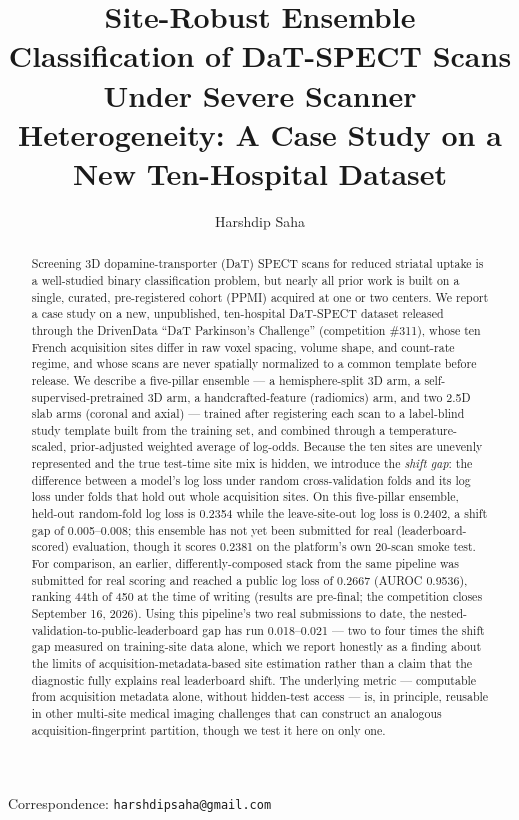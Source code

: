 \documentclass[11pt]{article}
\title{\textbf{Site-Robust Ensemble Classification of DaT-SPECT Scans Under Severe Scanner Heterogeneity: A Case Study on a New Ten-Hospital Dataset}}
\author[1]{Harshdip Saha}
\affil[1]{Independent Researcher}
\date{}
\begin{document}
\maketitle

\begin{center}
\small
Correspondence: \texttt{harshdipsaha@gmail.com}
\end{center}

\begin{abstract}
\noindent
Screening 3D dopamine-transporter (DaT) SPECT scans for reduced striatal uptake is a well-studied binary classification problem, but nearly all prior work is built on a single, curated, pre-registered cohort (PPMI) acquired at one or two centers. We report a case study on a new, unpublished, ten-hospital DaT-SPECT dataset released through the DrivenData ``DaT Parkinson's Challenge'' (competition \#311), whose ten French acquisition sites differ in raw voxel spacing, volume shape, and count-rate regime, and whose scans are never spatially normalized to a common template before release. We describe a five-pillar ensemble --- a hemisphere-split 3D arm, a self-supervised-pretrained 3D arm, a handcrafted-feature (radiomics) arm, and two 2.5D slab arms (coronal and axial) --- trained after registering each scan to a label-blind study template built from the training set, and combined through a temperature-scaled, prior-adjusted weighted average of log-odds. Because the ten sites are unevenly represented and the true test-time site mix is hidden, we introduce the \emph{shift gap}: the difference between a model's log loss under random cross-validation folds and its log loss under folds that hold out whole acquisition sites. On this five-pillar ensemble, held-out random-fold log loss is 0.2354 while the leave-site-out log loss is 0.2402, a shift gap of 0.005--0.008; this ensemble has not yet been submitted for real (leaderboard-scored) evaluation, though it scores 0.2381 on the platform's own 20-scan smoke test. For comparison, an earlier, differently-composed stack from the same pipeline was submitted for real scoring and reached a public log loss of 0.2667 (AUROC 0.9536), ranking 44th of 450 at the time of writing (results are pre-final; the competition closes September 16, 2026). Using this pipeline's two real submissions to date, the nested-validation-to-public-leaderboard gap has run 0.018--0.021 --- two to four times the shift gap measured on training-site data alone, which we report honestly as a finding about the limits of acquisition-metadata-based site estimation rather than a claim that the diagnostic fully explains real leaderboard shift. The underlying metric --- computable from acquisition metadata alone, without hidden-test access --- is, in principle, reusable in other multi-site medical imaging challenges that can construct an analogous acquisition-fingerprint partition, though we test it here on only one.
\end{abstract}
\end{document}
